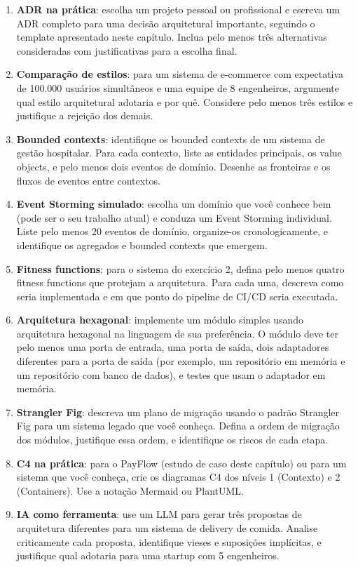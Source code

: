 \begin{enumerate}
    \item \textbf{ADR na prática}: escolha um projeto pessoal ou profissional e
    escreva um ADR completo para uma decisão arquitetural importante, seguindo
    o template apresentado neste capítulo. Inclua pelo menos três alternativas
    consideradas com justificativas para a escolha final.

    \item \textbf{Comparação de estilos}: para um sistema de e-commerce com
    expectativa de 100.000 usuários simultâneos e uma equipe de 8 engenheiros,
    argumente qual estilo arquitetural adotaria e por quê. Considere pelo menos
    três estilos e justifique a rejeição dos demais.

    \item \textbf{Bounded contexts}: identifique os bounded contexts de um
    sistema de gestão hospitalar. Para cada contexto, liste as entidades
    principais, os value objects, e pelo menos dois eventos de domínio.
    Desenhe as fronteiras e os fluxos de eventos entre contextos.

    \item \textbf{Event Storming simulado}: escolha um domínio que você conhece
    bem (pode ser o seu trabalho atual) e conduza um Event Storming individual.
    Liste pelo menos 20 eventos de domínio, organize-os cronologicamente, e
    identifique os agregados e bounded contexts que emergem.

    \item \textbf{Fitness functions}: para o sistema do exercício 2, defina
    pelo menos quatro fitness functions que protejam a arquitetura. Para cada
    uma, descreva como seria implementada e em que ponto do pipeline de CI/CD
    seria executada.

    \item \textbf{Arquitetura hexagonal}: implemente um módulo simples usando
    arquitetura hexagonal na linguagem de sua preferência. O módulo deve ter
    pelo menos uma porta de entrada, uma porta de saída, dois adaptadores
    diferentes para a porta de saída (por exemplo, um repositório em memória
    e um repositório com banco de dados), e testes que usam o adaptador em
    memória.

    \item \textbf{Strangler Fig}: descreva um plano de migração usando o
    padrão Strangler Fig para um sistema legado que você conheça. Defina a
    ordem de migração dos módulos, justifique essa ordem, e identifique os
    riscos de cada etapa.

    \item \textbf{C4 na prática}: para o PayFlow (estudo de caso deste
    capítulo) ou para um sistema que você conheça, crie os diagramas C4 dos
    níveis 1 (Contexto) e 2 (Containers). Use a notação Mermaid ou PlantUML.

    \item \textbf{IA como ferramenta}: use um LLM para gerar três propostas
    de arquitetura diferentes para um sistema de delivery de comida. Analise
    criticamente cada proposta, identifique vieses e suposições implícitas,
    e justifique qual adotaria para uma startup com 5 engenheiros.
\end{enumerate}
